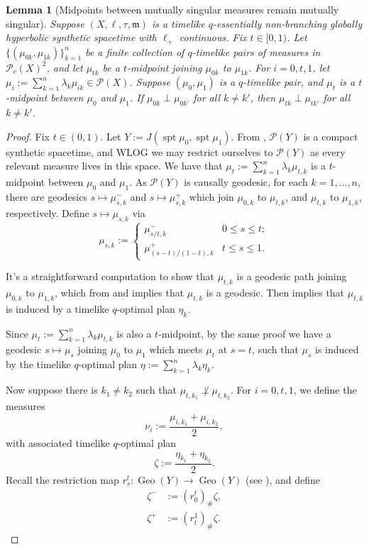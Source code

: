 \documentclass{article}
\newcommand{\m}{\mathfrak{m}}
\DeclareMathOperator{\spt}{spt}
\newcommand{\Pcal}{\mathcal{P}}
\DeclareMathOperator{\Geo}{Geo}
\newtheorem{lemma}[theorem]{Lemma}
\theoremstyle{definition}
\begin{document}
{\begin{lemma}[Midpoints between mutually singular measures remain mutually singular]\label{singularmidpoint}
Suppose $(X,\ell, \tau, \m)$ is a timelike $q$-essentially non-branching globally hyperbolic synthetic spacetime with $\ell_+$ continuous. Fix $t\in [0,1)$. Let $\{(\mu_{0k}, \mu_{1k})\}_{k=1}^n$ be a finite collection of $q$-timelike pairs of measures in $\Pcal_c(X)^2$, and let $\mu_{tk}$ be a $t$-midpoint joining $\mu_{0k}$ to $\mu_{1k}$. For $i=0,t,1$, let $\mu_{i}:=\sum_{k=1}^n \lambda_k\mu_{ik}\in \Pcal(X)$. Suppose $(\mu_0, \mu_1)$ is a $q$-timelike pair, and $\mu_t$ is a $t$-midpoint between $\mu_0$ and $\mu_1$. If  $\mu_{0k}\perp \mu_{0k'}$ for all $k\neq k'$, then $\mu_{t k}\perp \mu_{t k'}$ for all $k\neq k'$. 
\end{lemma}
\begin{proof}

\newcommand{\glu}{\operatorname{glu}}
Fix $t\in (0,1)$. 
Let $Y:=J(\spt\mu_0,\spt\mu_1)$. From , $\Pcal(Y)$ is a compact synthetic spacetime, and WLOG we may restrict ourselves to $\Pcal(Y)$ as every relevant measure lives in this space. We have that $\mu_t:= \sum_{k=1}^n \lambda_k \mu_{t,k}$ is a $t$-midpoint between $\mu_0$ and $\mu_1$. As $\Pcal(Y)$ is causally geodesic, for each $k=1,\dots, n$, there are geodesics $s\mapsto \mu^-_{s,k}$ and $s\mapsto \mu^+_{s,k}$ which join $\mu_{0,k}$ to $\mu_{t,k}$, and $\mu_{t,k}$ to $\mu_{1,k}$, respectively. Define $s\mapsto \mu_{s,k}$ via 
\[\mu_{s,k}:= \begin{cases}
\mu_{s/t,k}^- & 0\leq s\leq t;\\
\mu_{(s-t)/(1-t),k}^+ &t\leq s\leq 1.
\end{cases}\]

It's a straightforward computation to show that $\mu_{t,k}$ is a geodesic path joining $\mu_{0,k}$ to $\mu_{1,k}$, which from  and  implies that $\mu_{t,k}$ is a geodesic. Then  implies that $\mu_{t,k}$ is induced by a timelike $q$-optimal plan $\eta_{k}$. 

Since $\mu_t:= \sum_{k=1}^n \lambda_k\mu_{t,k}$ is also a $t$-midpoint, by the same proof we have a geodesic $s\mapsto \mu_s$ joining $\mu_0$ to $\mu_1$ which meets $\mu_t$ at $s=t$, such that $\mu_s$ is induced by the timelike $q$-optimal plan $\eta:=\sum_{k=1}^n \lambda_k \eta_k$. 

Now suppose there is $k_1\neq k_2$ such that $\mu_{t,k_1}\not\perp \mu_{t,k_2}$. For $i=0,t,1$, we define the measures
\[\nu_i:= \frac{\mu_{i,k_1}+\mu_{i,k_2}}{2},\]
with associated timelike $q$-optimal plan 
\[\zeta:= \frac{\eta_{k_1}+\eta_{k_2}}{2}.\] 
Recall the restriction map $r_s^t:\Geo(Y)\to \Geo(Y)$ (see ), and define 
\begin{align*}
\zeta^-&:= (r_0^t)_\# \zeta,\\
\zeta^+&:= (r_t^1)_\#\zeta.
\end{align*}



\end{proof}}
\end{document}
